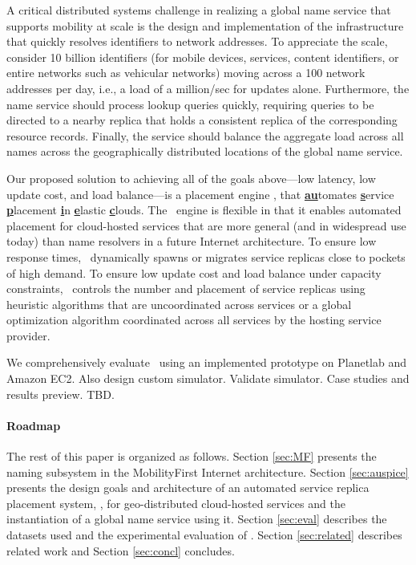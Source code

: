 {A critical distributed systems challenge in realizing a global name service that supports mobility at scale  is the design and implementation of the infrastructure that quickly resolves identifiers to network addresses. To appreciate the scale, consider 10 billion identifiers (for mobile devices, services, content identifiers, or entire networks such as vehicular networks) moving across a 100 network addresses per day, i.e., a load of a million/sec for updates alone. Furthermore, the name service should process lookup queries quickly, requiring queries to be directed to a nearby replica that holds a consistent replica of the corresponding resource records. Finally, the service should balance the aggregate load across all names across the geographically distributed locations of the global name service. 

Our proposed solution to achieving all of the goals above---low latency, low update cost, and load balance---is a placement engine \auspice, that {\underline{\bf au}}tomates {\underline{\bf s}}ervice {\underline{\bf p}}lacement {\underline{\bf i}}n {\underline{\bf e}}lastic {\underline{\bf c}}louds. The \auspice\ engine is flexible in that it enables automated placement for cloud-hosted services that are more general (and in widespread use today) than name resolvers in a future Internet architecture. To ensure low response times, \auspice\ dynamically spawns or migrates service replicas close to pockets of high demand. To ensure low update cost and load balance under capacity constraints, \auspice\ controls the number and placement of service replicas using heuristic algorithms that are uncoordinated across services or a global optimization algorithm coordinated across all services by the hosting service provider.

We comprehensively evaluate \auspice\ using an implemented prototype on Planetlab and Amazon EC2. Also design custom simulator. Validate simulator. Case studies and results preview. TBD.

\paragraph{Roadmap} The rest of this paper is organized as follows. Section \ref{sec:MF} presents the naming subsystem in the MobilityFirst Internet architecture. Section \ref{sec:auspice} presents the design goals and architecture of an automated service replica placement system, \auspice, for geo-distributed cloud-hosted services and the instantiation of a global name service using it. Section \ref{sec:eval} describes the datasets used and the experimental evaluation of \auspice. Section \ref{sec:related} describes related work and Section \ref{sec:concl} concludes.

}
